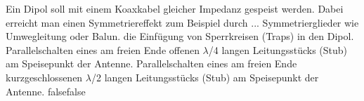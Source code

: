     {Ein Dipol soll mit einem Koaxkabel gleicher Impedanz gespeist werden. Dabei erreicht man einen Symmetriereffekt zum Beispiel durch ...}
    {Symmetrierglieder wie Umwegleitung oder Balun.}
    {die Einfügung von Sperrkreisen (Traps) in den Dipol.}
    {Parallelschalten eines am freien Ende offenen $\lambda$/4 langen Leitungsstücks (Stub) am Speisepunkt der Antenne.}
    {Parallelschalten eines am freien Ende kurzgeschlossenen $\lambda$/2 langen Leitungsstücks (Stub) am Speisepunkt der Antenne.}
    {false}{false}